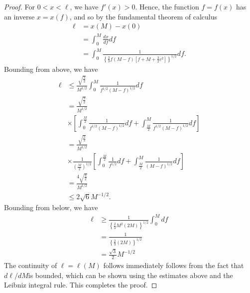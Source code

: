 \documentclass[12pt,reqno]{amsart}
\numberwithin{equation}{section}  %
\begin{document}
\begin{proof}
%
For $0 < x < \ell$, we have $f'(x) > 0$. Hence, the function $f = f(x)$ has an
inverse $x = x(f)$, and so by the fundamental theorem of calculus 
%
%
\begin{equation*}
\begin{split}
\ell & = x(M) - x(0)
\\
& = \int_{0}^{M} \frac{dx}{df} df
\\
& = \int_{0}^{M} \frac{1}{ \left\{ \frac{2}{3}f(M-f)
\left[ f + M + \frac{3}{2} c^{2} \right] \right\}^{1/2}} df.
\end{split}
\end{equation*}
%
Bounding from above, we have
%
%
\begin{equation*}
\begin{split}
\ell
& \le \frac{\sqrt{\frac{3}{2}}}{M^{1/2}} \int_{0}^{M} \frac{1}{f^{1/2}(M-f)^{1/2}}df
\\
& = \frac{\sqrt{\frac{3}{2}}}
{M^{1/2}} 
\\
& \times \left[ \int_{0}^{\frac{M}{2}} \frac{1}{f^{1/2}(M-f)^{1/2}}df 
+ \int_{\frac{M}{2}}^{M} \frac{1}{f^{1/2}(M-f)^{1/2}}df
\right]
\\
& = \frac{\sqrt{\frac{3}{2}}}
{M^{1/2}} 
\\
& \times \frac{1}{\left( \frac{M}{2} \right)^{1/2}} \left[ \int_{0}^{\frac{M}{2}} \frac{1}{f^{1/2}}df 
+ \int_{\frac{M}{2}}^{M} \frac{1}{(M-f)^{1/2}}df
\right]
\\
& = \frac{4 \sqrt{\frac{3}{2}}}
{M^{1/2}} 
\\
& \le 2 \sqrt{6} M ^{-1/2}.
\end{split}
\end{equation*}
%
%
Bounding from below, we have
%
%
\begin{equation*}
\begin{split}
\ell
& \ge  \frac{1}{ \left\{ \frac{2}{3}M^{2}
\left( 2M 
\right) \right\}^{1/2}} \int_{0}^{M} df
\\
& = \frac{1}{\left\{ \frac{2}{3}
\left( 2M 
\right) \right\}^{1/2}} 
\\
& = \frac{\sqrt{3}}{2} M^{-1/2}
\end{split}
\end{equation*}
%
The continuity of $\ell = \ell(M)$ follows immediately follows from the fact
that $d\ell /dM$is bounded, which can be shown using the estimates above and
the Leibniz integral rule. This completes the proof.
\end{proof}
%
%
%
%
%
\end{document}
